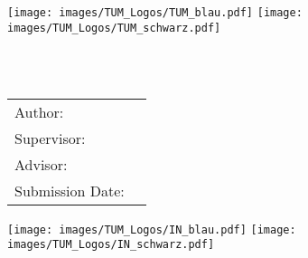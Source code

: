 \begin{titlepage}
	\centering
	
	\ifx \monochromeCoverInside \undefined
		\texttt{[image: images/TUM\_Logos/TUM\_blau.pdf]}%
	\else
		\texttt{[image: images/TUM\_Logos/TUM\_schwarz.pdf]}%
	\fi
	\vspace*{20mm}
	
	\vspace{5mm}
	{\huge\MakeUppercase{\faculty}}\\
	
	\vspace{5mm}
	{\large\MakeUppercase{\uni}}\\
	
	\vspace{20mm}
	{\Large \worktype}
	
	\vspace{15mm}
	{\huge\bfseries \titleFirstLanguage}
	
	\vspace{10mm}
	{\huge\bfseries \foreignlanguage{ngerman}{\titleForeignLanguage}}
	
	\vspace{15mm}
	\begin{tabular}{l l}
		Author:          & \authorname \\
		Supervisor:      & \supervisor \\
		Advisor:         & \advisor \\
		Submission Date: & \submissionDate \\
	\end{tabular}
	
	\vspace*{20mm}
	
	\ifx \monochromeCoverInside \undefined
		\texttt{[image: images/TUM\_Logos/IN\_blau.pdf]}%
	\else
		\texttt{[image: images/TUM\_Logos/IN\_schwarz.pdf]}%
	\fi
	{}
\end{titlepage}